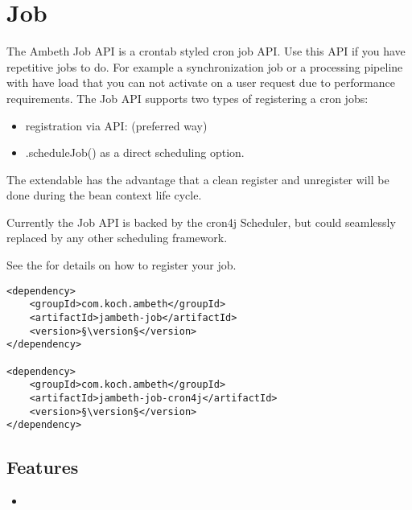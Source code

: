 \section{Job}
\label{module:Job}
\ClearAPI
The Ambeth Job API is a crontab styled cron job API. Use this API if you have repetitive jobs to do. For example a synchronization job or a processing pipeline with have load that you can not activate on a user request due to performance requirements. The Job API supports two types of registering a cron jobs:

\begin{itemize}
	\item registration via  API:  (preferred way)
	\item {}.scheduleJob() as a direct scheduling option.
\end{itemize}

The extendable has the advantage that a clean register and unregister will be done during the bean context life cycle.

Currently the Job API is backed by the cron4j Scheduler, but could seamlessly replaced by any other scheduling framework. 

See the  for details on how to register your job.

\begin{lstlisting}[style=POM,caption={Maven modules to use \emph{Ambeth Job}}]
<dependency>
	<groupId>com.koch.ambeth</groupId>
	<artifactId>jambeth-job</artifactId>
	<version>§\version§</version>
</dependency>

<dependency>
	<groupId>com.koch.ambeth</groupId>
	<artifactId>jambeth-job-cron4j</artifactId>
	<version>§\version§</version>
</dependency>
\end{lstlisting}
\subsection{Features}
\begin{itemize}
	\item {}
\end{itemize}


